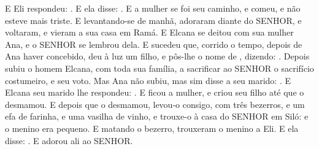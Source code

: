 {  E Eli respondeu: .
  E ela disse: . E a mulher se foi seu caminho, e comeu, e não esteve mais triste.
  E levantando-se de manhã, adoraram diante do SENHOR, e voltaram, e vieram a sua casa em Ramá. E Elcana se deitou com sua mulher Ana, e o SENHOR se lembrou dela.
  E sucedeu que, corrido o tempo, depois de Ana haver concebido, deu à luz um filho, e pôs-lhe o nome de , dizendo: .
  Depois subiu o homem Elcana, com toda sua família, a sacrificar ao SENHOR o sacrifício costumeiro, e seu voto.
  Mas Ana não subiu, mas sim disse a seu marido: .
  E Elcana seu marido lhe respondeu: . E ficou a mulher, e criou seu filho até que o desmamou. %
  E depois que o desmamou, levou-o consigo, com três bezerros, e um efa de farinha, e uma vasilha de vinho, e trouxe-o à casa do SENHOR em Siló: e o menino era pequeno.
  E matando o bezerro, trouxeram o menino a Eli.
  E ela disse: . E adorou ali ao SENHOR.
\par }

